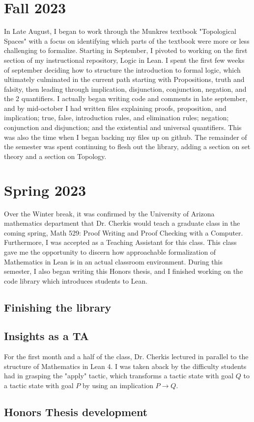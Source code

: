 
\section{Fall 2023}

In Late August, I began to work through the Munkres textbook
"Topological Spaces" with a focus on identifying which parts
of the textbook were more or less challenging to formalize. 
Starting in September, I pivoted to working on the first section
of my instructional repository, Logic in Lean. I spent the first few 
weeks of september deciding how to structure the introduction to 
formal logic, which ultimately culminated in the current path
starting with Propositions, truth and falsity, then leading through
implication, disjunction, conjunction, negation, and the 2 quantifiers.
I actually began writing code and comments in late september, and by
mid-october I had written files explaining proofs, proposition, and
implication; true, false, introduction rules, and elimination rules;
negation; conjunction and disjunction; and the existential and 
universal quantifiers. This was also the time when I began backing 
my files up on github. The remainder of the semester was spent 
continuing to flesh out the library, adding a section on set theory
and a section on Topology.

\section{Spring 2023}

Over the Winter break, it was confirmed by the University of Arizona
mathematics department that Dr. Cherkis would teach a graduate class
in the coming spring, Math 529: Proof Writing and Proof Checking with
a Computer. Furthermore, I was accepted as a Teaching Assistant for
this class. This class gave me the opportunity to discern how 
approachable formalization of Mathematics in Lean is in an actual
classroom environment. During this semester, I also began writing 
this Honors thesis, and I finished working on the code library
which introduces students to Lean. 

\subsection{Finishing the library}

\subsection{Insights as a TA}

For the first month and a half of the class, Dr. Cherkis lectured
in parallel to the structure of Mathematics in Lean 4. I was taken
aback by the difficulty students had in grasping the "apply" tactic,
which transforms a tactic state with goal $Q$ to a tactic state
with goal $P$ by using an implication $P\to Q$.

\subsection{Honors Thesis development}